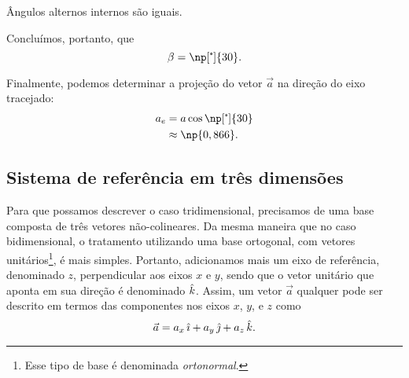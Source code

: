 \begin{marginfigure}
\centering
{}
\caption{Ângulos alternos internos são iguais.\label{Fig:Ex:AlternosInternos}}
\end{marginfigure}

\noindent{}Concluímos, portanto, que
\begin{equation}
    \beta = \np[\tcdegree]{30}.
\end{equation}

Finalmente, podemos determinar a projeção do vetor $\vec{a}$ na direção do eixo tracejado:
\begin{align}
    a_e &= a\cos\np[\tcdegree]{30} \\
    &\approx \np{0,866}.
\end{align}

\subsection{Sistema de referência em três dimensões}

Para que possamos descrever o caso tridimensional, precisamos de uma base composta de três vetores não-colineares. Da mesma maneira que no caso bidimensional, o tratamento utilizando uma base ortogonal, com vetores unitários\footnote[][-3cm]{Esse tipo de base é denominada \emph{ortonormal}.}, é mais simples. Portanto, adicionamos mais um eixo de referência, denominado $z$, perpendicular aos eixos $x$ e $y$, sendo que o vetor unitário que aponta em sua direção é denominado $\hat{k}$. Assim, um vetor $\vec{a}$ qualquer pode ser descrito em termos das componentes nos eixos $x$, $y$, e $z$ como
\begin{equation}
    \vec{a} = a_x \,\hat{\imath} + a_y\,\hat{\jmath} + a_z\,\hat{k}.
\end{equation}

